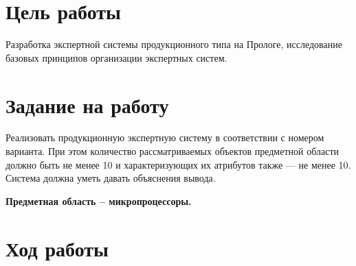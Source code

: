 \documentclass[a4paper,14pt]{extarticle}
\begin{document}


\section{Цель работы}
Разработка экспертной системы продукционного типа на Прологе, исследование
базовых принципов организации экспертных систем.

\section{Задание на работу}
Реализовать продукционную экспертную систему в соответствии с номером варианта.
При этом количество рассматриваемых объектов предметной области должно быть не
менее 10 и характеризующих их атрибутов также — не менее 10. Система должна
уметь давать объяснения вывода.

\textbf{Предметная область – микропроцессоры.}

\section{Ход работы}
\end{document}
